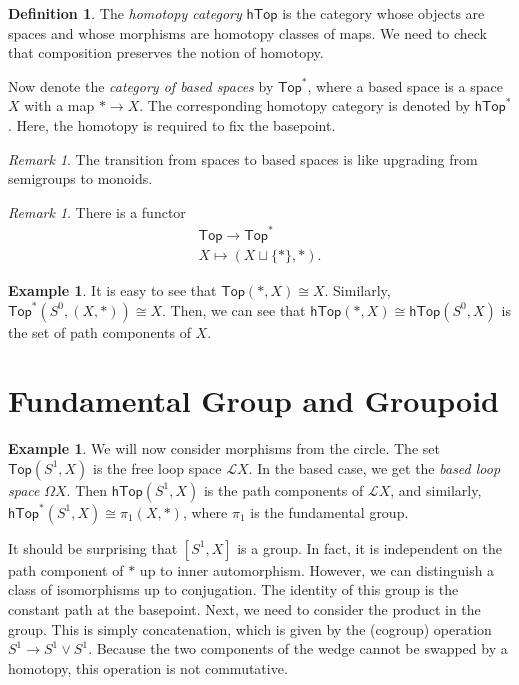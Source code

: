 \documentclass[leqno, openany]{memoir}
\theoremstyle{definition}
\newtheorem{defn}[thm]{Definition}
\newtheorem{exm}[thm]{Example}
\theoremstyle{remark}
\newtheorem{rmk}[thm]{Remark}
\theoremstyle{plain}
\theoremstyle{definition}
\theoremstyle{remark}
\newcommand{\mc}[1]{\mathcal{#1}}
\newcommand{\ms}[1]{\mathsf{#1}}
\begin{document}
\begin{defn} The \textit{homotopy category} $\ms{hTop}$ is the category whose
objects are spaces and whose morphisms are homotopy classes of maps. We need to
check that composition preserves the notion of homotopy.  \end{defn}

Now denote the \textit{category of based spaces} by $\ms{Top}^*$, where a based
space is a space $X$ with a map $* \to X$. The corresponding homotopy category
is denoted by $\ms{hTop}^*$. Here, the homotopy is required to fix the
basepoint.

\begin{rmk} The transition from spaces to based spaces is like upgrading from
semigroups to monoids.  \end{rmk}

\begin{rmk} There is a functor \begin{align*} \ms{Top} \to \ms{Top}^* \\ X
\mapsto (X \sqcup \{*\}, *).  \end{align*} \end{rmk}

\begin{exm} It is easy to see that $\ms{Top}(*,X) \cong X$. Similarly,
$\ms{Top}^*(S^0,(X,*)) \cong X$. Then, we can see that $\ms{hTop}(*,X) \cong
\ms{hTop}(S^0,X)$ is the set of path components of $X$.  \end{exm}

\section{Fundamental Group and Groupoid}%
\label{sec:fundamental_group_and_groupoid}

\begin{exm} We will now consider morphisms from the circle. The set
    $\ms{Top}(S^1,X)$ is the free loop space $\mc{L}X$. In the based case, we
    get the \textit{based loop space} $\Omega X$. Then $\ms{hTop}(S^1,X)$ is
    the path components of $\mc{L}X$, and similarly, $\ms{hTop}^*(S^1,X) \cong
    \pi_1(X,*)$, where $\pi_1$ is the fundamental group.  \end{exm}

It should be surprising that $[S^1,X]$ is a group. In fact, it is independent
on the path component of $*$ up to inner automorphism. However, we can
distinguish a class of isomorphisms up to conjugation. The identity of this
group is the constant path at the basepoint. Next, we need to consider the
product in the group. This is simply concatenation, which is given by the
(cogroup) operation $S^1 \to S^1 \vee S^1$. Because the two components of the
wedge cannot be swapped by a homotopy, this operation is not commutative.
\end{document}
